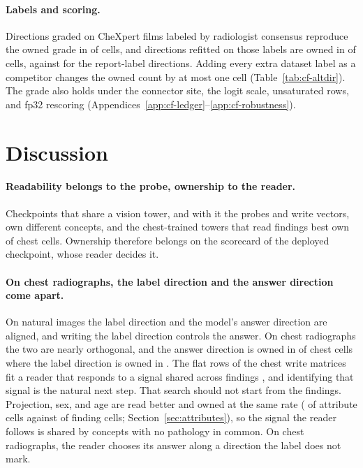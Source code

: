 \documentclass[11pt]{article}
\begin{document}
\paragraph{Labels and scoring.} Directions graded on \cfValidRows{} CheXpert films labeled by radiologist consensus reproduce the owned grade in \cfValidOwnedAgree{} of \cfValidCells{} cells, and directions refitted on those labels are owned in \cfValidfitOwnedExpert{} of \cfValidfitCells{} cells, against \cfValidfitOwnedReport{} for the report-label directions. Adding every extra dataset label as a competitor changes the owned count by at most one cell (Table~\ref{tab:cf-altdir}). The grade also holds under the connector site, the logit scale, unsaturated rows, and fp32 rescoring (Appendices~\ref{app:cf-ledger}--\ref{app:cf-robustness}).

\FloatBarrier

\section{Discussion}
\label{sec:implications}

\paragraph{Readability belongs to the probe, ownership to the reader.}
Checkpoints that share a vision tower, and with it the probes and write vectors, own different concepts, and the chest-trained towers that read findings best own \cfSpecTowerOwned{} of \cfSpecTowerN{} chest cells. Ownership therefore belongs on the scorecard of the deployed checkpoint, whose reader decides it.

\paragraph{On chest radiographs, the label direction and the answer direction come apart.}
On natural images the label direction and the model's answer direction are aligned, and writing the label direction controls the answer. On chest radiographs the two are nearly orthogonal, and the answer direction is owned in \cfAnsChestOwnedA{} of \cfAnsChestN{} chest cells where the label direction is owned in \cfAnsChestOwnedLabel{}. The flat rows of the chest write matrices fit a reader that responds to a signal shared across findings \citep{pahde2025navigating}, and identifying that signal is the natural next step. That search should not start from the findings. Projection, sex, and age are read better and owned at the same rate (\cfAttrAllAttrOwned{} of \cfAttrAllAttrN{} attribute cells against \cfAttrAllClinOwned{} of \cfAttrAllClinN{} finding cells; Section~\ref{sec:attributes}), so the signal the reader follows is shared by concepts with no pathology in common. On chest radiographs, the reader chooses its answer along a direction the label does not mark.
\end{document}
